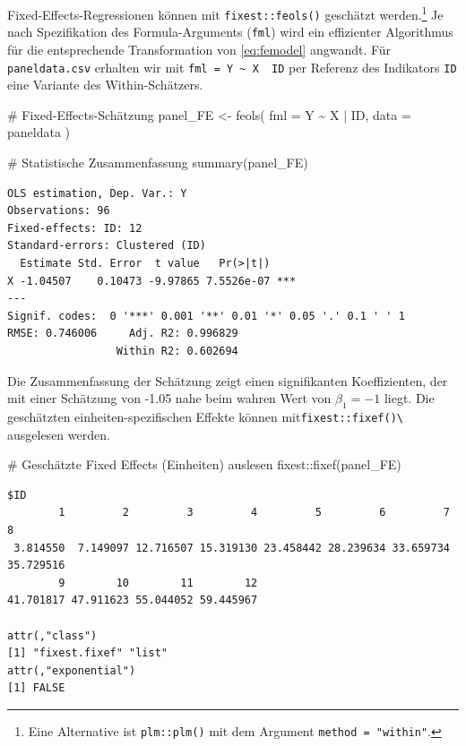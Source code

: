 \documentclass[
  a4paper,
  DIV=11,
  oneside]{scrreprt}
\newenvironment{Shaded}{\begin{snugshade}}{\end{snugshade}}
\newcommand{\AttributeTok}[1]{\textcolor[rgb]{0.40,0.45,0.13}{#1}}
\newcommand{\CommentTok}[1]{\textcolor[rgb]{0.37,0.37,0.37}{#1}}
\newcommand{\FunctionTok}[1]{\textcolor[rgb]{0.28,0.35,0.67}{#1}}
\newcommand{\NormalTok}[1]{\textcolor[rgb]{0.00,0.23,0.31}{#1}}
\newcommand{\OtherTok}[1]{\textcolor[rgb]{0.00,0.23,0.31}{#1}}
\newcommand{\SpecialCharTok}[1]{\textcolor[rgb]{0.37,0.37,0.37}{#1}}
\begin{document}
Fixed-Effects-Regressionen können mit \texttt{fixest::feols()} geschätzt
werden.\footnote{Eine Alternative ist \texttt{plm::plm()} mit dem
  Argument \texttt{method\ =\ "within"}.} Je nach Spezifikation des
Formula-Arguments (\texttt{fml}) wird ein effizienter Algorithmus für
die entsprechende Transformation von \eqref{eq:femodel} angwandt. Für
\texttt{paneldata.csv} erhalten wir mit
\texttt{fml\ =\ Y\ \textasciitilde{}\ X\ \textbar{}\ ID} per Referenz
des Indikators \texttt{ID} eine Variante des Within-Schätzers.

\begin{Shaded}
\begin{Highlighting}[]
\CommentTok{\# Fixed{-}Effects{-}Schätzung}
\NormalTok{panel\_FE }\OtherTok{\textless{}{-}} \FunctionTok{feols}\NormalTok{(}
  \AttributeTok{fml =}\NormalTok{ Y }\SpecialCharTok{\textasciitilde{}}\NormalTok{ X }\SpecialCharTok{|}\NormalTok{ ID,  }
  \AttributeTok{data =}\NormalTok{ paneldata}
\NormalTok{)}

\CommentTok{\# Statistische Zusammenfassung}
\FunctionTok{summary}\NormalTok{(panel\_FE)}
\end{Highlighting}
\end{Shaded}

\begin{verbatim}
OLS estimation, Dep. Var.: Y
Observations: 96
Fixed-effects: ID: 12
Standard-errors: Clustered (ID) 
  Estimate Std. Error  t value   Pr(>|t|)    
X -1.04507    0.10473 -9.97865 7.5526e-07 ***
---
Signif. codes:  0 '***' 0.001 '**' 0.01 '*' 0.05 '.' 0.1 ' ' 1
RMSE: 0.746006     Adj. R2: 0.996829
                 Within R2: 0.602694
\end{verbatim}

Die Zusammenfassung der Schätzung zeigt einen signifikanten
Koeffizienten, der mit einer Schätzung von -1.05 nahe beim wahren Wert
von \(\beta_1 = -1\) liegt. Die geschätzten einheiten-spezifischen
Effekte können mit\texttt{fixest::fixef()\textbackslash{}} ausgelesen
werden.

\begin{Shaded}
\begin{Highlighting}[]
\CommentTok{\# Geschätzte Fixed Effects (Einheiten) auslesen}
\NormalTok{fixest}\SpecialCharTok{::}\FunctionTok{fixef}\NormalTok{(panel\_FE)}
\end{Highlighting}
\end{Shaded}

\begin{verbatim}
$ID
        1         2         3         4         5         6         7         8 
 3.814550  7.149097 12.716507 15.319130 23.458442 28.239634 33.659734 35.729516 
        9        10        11        12 
41.701817 47.911623 55.044052 59.445967 

attr(,"class")
[1] "fixest.fixef" "list"        
attr(,"exponential")
[1] FALSE
\end{verbatim}
\end{document}
